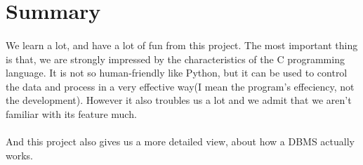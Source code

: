 \documentclass[a4paper, 12pt]{article}
\begin{document}
\section{Summary}
    \paragraph{}
        We learn a lot, and have a lot of fun from this project. The most important thing is that, we are strongly impressed by the characteristics of the C programming language. It is not so human-friendly like Python, but it can be used to control the data and process in a very effective way(I mean the program's effeciency, not the development). However it also troubles us a lot and we admit that we aren't familiar with its feature much.
    \paragraph{}
        And this project also gives us a more detailed view, about how a DBMS actually works.
\end{document}
